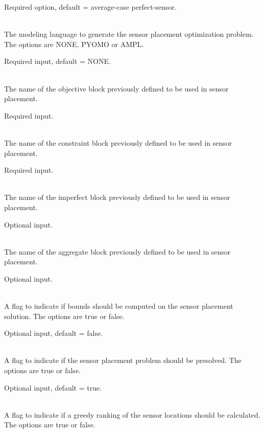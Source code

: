 \begin{description}[topsep=0pt,parsep=0.5em,itemsep=-0.4em]
\begin{description}[topsep=0pt,parsep=0.5em,itemsep=-0.4em]
                Required option, default = average-case perfect-sensor.
    \item[{modeling language}]\hfill
\\The modeling language to generate the sensor placement optimization 
                problem. The options are NONE, PYOMO or AMPL. 

                Required input, default = NONE.
    \item[{objective}]\hfill
\\The name of the objective block previously defined to be used in sensor placement.
                
                Required input.
    \item[{constraint}]\hfill
\\The name of the constraint block previously defined to be used in sensor placement.
                
                Required input.
    \item[{imperfect}]\hfill
\\The name of the imperfect block previously defined to be used in sensor placement.
                
                Optional input.
    \item[{aggregate}]\hfill
\\The name of the aggregate block previously defined to be used in sensor placement.
                
                Optional input.
    \item[{compute bound}]\hfill
\\A flag to indicate if bounds should be computed on the sensor placement
                solution. The options are true or false. 
                
                Optional input, default = false.
    \item[{presolve}]\hfill
\\A flag to indicate if the sensor placement problem should be presolved. 
                The options are true or false. 
                
                Optional input, default = true.
    \item[{compute greedy ranking}]\hfill
\\A flag to indicate if a greedy ranking of the sensor locations should be calculated. 
                The options are true or false. 
                

\end{description}
\end{description}
